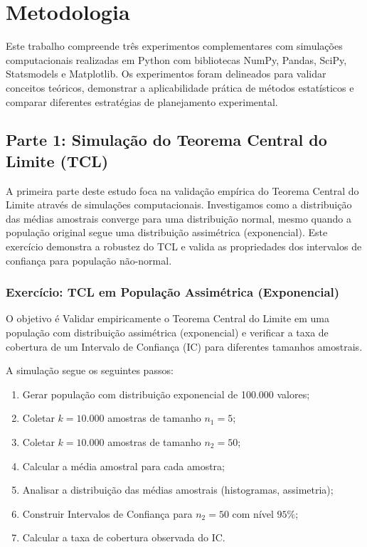 \documentclass[12pt,a4paper,oneside]{article}
\begin{document}
\section{Metodologia}

Este trabalho compreende três experimentos complementares com simulações computacionais realizadas em Python com bibliotecas NumPy, Pandas, SciPy, Statsmodels e Matplotlib. Os experimentos foram delineados para validar conceitos teóricos, demonstrar a aplicabilidade prática de métodos estatísticos e comparar diferentes estratégias de planejamento experimental.

\subsection{Parte 1: Simulação do Teorema Central do Limite (TCL)}

A primeira parte deste estudo foca na validação empírica do Teorema Central do Limite através de simulações computacionais. Investigamos como a distribuição das médias amostrais converge para uma distribuição normal, mesmo quando a população original segue uma distribuição assimétrica (exponencial). Este exercício demonstra a robustez do TCL e valida as propriedades dos intervalos de confiança para população não-normal.

\subsubsection{Exercício: TCL em População Assimétrica (Exponencial)}

O objetivo é Validar empiricamente o Teorema Central do Limite em uma população com distribuição assimétrica (exponencial) e verificar a taxa de cobertura de um Intervalo de Confiança (IC) para diferentes tamanhos amostrais.

A simulação segue os seguintes passos:
\begin{enumerate}
    \item Gerar população com distribuição exponencial de 100.000 valores;
    \item Coletar $k = 10.000$ amostras de tamanho $n_1 = 5$;
    \item Coletar $k = 10.000$ amostras de tamanho $n_2 = 50$;
    \item Calcular a média amostral para cada amostra;
    \item Analisar a distribuição das médias amostrais (histogramas, assimetria);
    \item Construir Intervalos de Confiança para $n_2 = 50$ com nível $95\%$;
    \item Calcular a taxa de cobertura observada do IC.
\end{enumerate}
\end{document}
